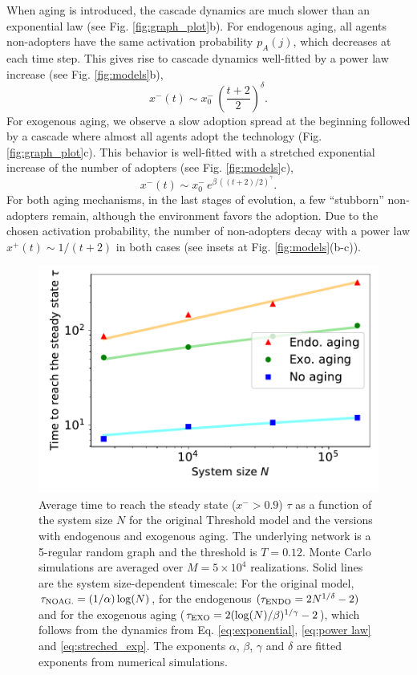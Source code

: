 When aging is introduced, the cascade dynamics are much slower than an exponential law (see Fig. \ref{fig:graph_plot}b). For endogenous aging, all agents non-adopters have the same activation probability $p_A(j)$, which decreases at each time step. This gives rise to cascade dynamics well-fitted by a power law increase (see Fig. \ref{fig:models}b),
\begin{equation}
x^{-}(t) \sim x^{-}_0 \, \left( \frac{t + 2}{2}\right)^\delta .
\label{eq:power law}
\end{equation}
For exogenous aging, we observe a slow adoption spread at the beginning followed by a cascade where almost all agents adopt the technology (Fig. \ref{fig:graph_plot}c). This behavior is well-fitted with a stretched exponential increase of the number of adopters (see Fig. \ref{fig:models}c),
\begin{equation}
x^{-}(t) \sim  x^{-}_0\,  e^{\beta \, ((t + 2) / 2)^{\gamma}} .
\label{eq:streched_exp}
\end{equation}
For both aging mechanisms, in the last stages of evolution, a few ``stubborn'' non-adopters remain, although the environment favors the adoption. Due to the chosen activation probability, the number of non-adopters decay with a power law $x^{+}(t) \sim 1/(t+2)$ in both cases (see insets at Fig. \ref{fig:models}(b-c)).

\begin{figure}
\centering \captionsetup{font=sf}
\includegraphics[width=0.6\columnwidth]{Figs/Aging_Threshold/time_steady.pdf}
\caption[Average time to reach the steady state $\tau$]{\label{fig:time_steady} Average time to reach the steady state ($x^{-} > 0.9$) $\tau$ as a function of the system size $N$ for the original Threshold model and the versions with endogenous and exogenous aging. The underlying network is a 5-regular random graph and the threshold is $T = 0.12$. Monte Carlo simulations are averaged over $M = 5 \times 10^4$ realizations. Solid lines are the system size-dependent timescale: For the original model, $\tau_{\rm{NO AG.}} = (1/\alpha)\log(N)$, for the endogenous $(\tau_{\rm{ENDO}} = 2N^{1/\delta} - 2)$ and for the exogenous aging ($\tau_{\rm{EXO}} = 2(\log(N)/\beta)^{1/\gamma} - 2$), which follows from the dynamics from Eq. \eqref{eq:exponential}, \eqref{eq:power law} and \eqref{eq:streched_exp}. The exponents $\alpha$, $\beta$, $\gamma$ and $\delta$ are fitted exponents from numerical simulations.}
\end{figure}

